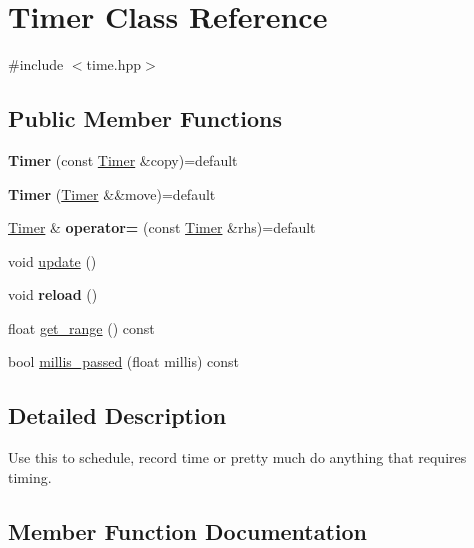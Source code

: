 \hypertarget{class_timer}{}\section{Timer Class Reference}
\label{class_timer}


{\ttfamily \#include $<$time.\+hpp$>$}

\subsection*{Public Member Functions}
\begin{DoxyCompactItemize}
\item 
\mbox{\label{class_timer_ade8edd45b4a73ee4fa2da7e8194139f8}} 
{\bfseries Timer} (const \mbox{\hyperlink{class_timer}{Timer}} \&copy)=default
\item 
\mbox{\label{class_timer_a052323c1f84ed1f326f0091e3bb8664c}} 
{\bfseries Timer} (\mbox{\hyperlink{class_timer}{Timer}} \&\&move)=default
\item 
\mbox{\label{class_timer_a100eb8bf102e423dbd2acd612c222681}} 
\mbox{\hyperlink{class_timer}{Timer}} \& {\bfseries operator=} (const \mbox{\hyperlink{class_timer}{Timer}} \&rhs)=default
\item 
void \mbox{\hyperlink{class_timer_a745ad59b5a46744cd871a1129a25d74f}{update}} ()
\item 
\mbox{\label{class_timer_a0e0c29ff6d17ee6e159e8901a3127ee1}} 
void {\bfseries reload} ()
\item 
float \mbox{\hyperlink{class_timer_aa24270892c235a1210575f09a362b9f0}{get\+\_\+range}} () const
\item 
bool \mbox{\hyperlink{class_timer_ab8b727d8919cde4e920b9cbcfdeeaef1}{millis\+\_\+passed}} (float millis) const
\end{DoxyCompactItemize}


\subsection{Detailed Description}
Use this to schedule, record time or pretty much do anything that requires timing. 

\subsection{Member Function Documentation}
\mbox{\label{class_timer_aa24270892c235a1210575f09a362b9f0}} 
